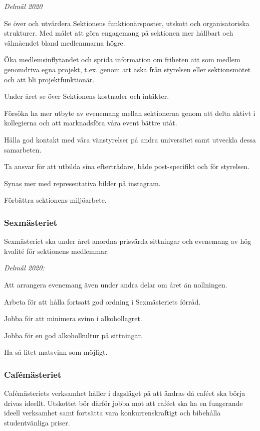 \documentclass[../_main/handlingar.tex]{subfiles}
\begin{document}
\emph{Delmål 2020}
\begin{dashlist}
    \item Se över och utvärdera Sektionens funktionärsposter, utskott och organisatoriska strukturer. Med målet att göra engagemang på sektionen mer hållbart och välmåendet bland medlemmarna högre. 
    \item Öka medlemsinflytandet och sprida information om friheten att som medlem genomdriva egna projekt, t.ex. genom att äska från styrelsen eller sektionsmötet och att bli projektfunktionär.   
    \item Under året se över Sektionens kostnader och intäkter. 
    \item Försöka ha mer utbyte av evenemang mellan sektionerna genom att delta aktivt i kollegierna och att marknadsföra våra event bättre utåt.
    \item Hålla god kontakt med våra vänstyrelser på andra universitet samt utveckla dessa samarbeten. 
    \item Ta ansvar för att utbilda sina efterträdare, både post-specifikt och för styrelsen.
	\item Synas mer med representativa bilder på instagram.
	 \item Förbättra sektionens miljöarbete. \scalebox{0.5}{\recycle}
\end{dashlist}
\newpage
\subsubsection*{Sexmästeriet}
Sexmästeriet ska under året anordna prisvärda sittningar och evenemang av hög kvalité för sektionens medlemmar. 

\emph{Delmål 2020:}
\begin{dashlist}
	\item Att arrangera evenemang även under andra delar om året än nollningen.
	\item Arbeta för att hålla fortsatt god ordning i Sexmästeriets förråd.
	\item Jobba för att minimera svinn i alkohollagret. 
	\item Jobba för en god alkoholkultur på sittningar.
	\item Ha så litet matsvinn som möjligt. 
\end{dashlist}

\subsubsection*{Cafémästeriet}
Cafémästeriets verksamhet håller i dagsläget på att ändras då caféet ska börja drivas ideellt. Utskottet bör därför jobba mot att caféet ska ha en fungerande ideell verksamhet samt fortsätta vara konkurrenskraftigt och bibehålla studentvänliga priser.
\end{document}
